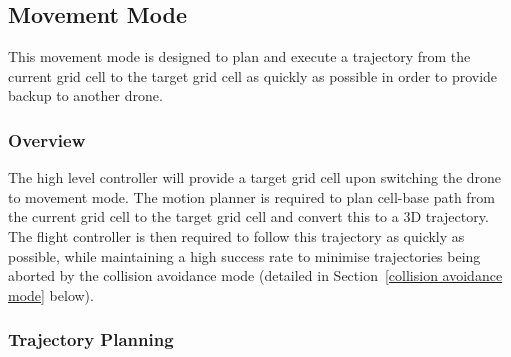 \documentclass{report_template_oxford}
\begin{document}
\subsection{Movement Mode} %
\label{movement mode}

This movement mode is designed to plan and execute a trajectory from the current grid cell to the target grid cell as quickly as possible in order to provide backup to another drone.

\subsubsection{Overview}
The high level controller will provide a target grid cell upon switching the drone to movement mode. The motion planner is required to plan cell-base path from the current grid cell to the target grid cell and convert this to a 3D trajectory. The flight controller is then required to follow this trajectory as quickly as possible, while maintaining a high success rate to minimise trajectories being aborted by the collision avoidance mode (detailed in Section~\ref{collision avoidance mode} below). 


\subsubsection{Trajectory Planning}
\end{document}
